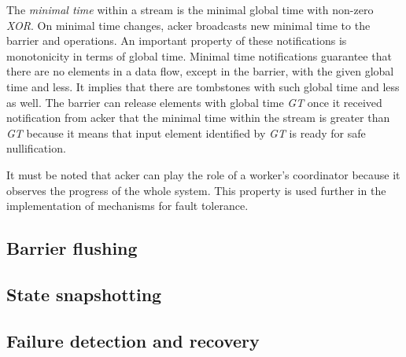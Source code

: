 The {\em minimal time} within a stream is the minimal global time with non-zero {\it XOR}. On minimal time changes, acker broadcasts new minimal time to the barrier and operations. An important property of these notifications is monotonicity in terms of global time. Minimal time notifications guarantee that there are no elements in a data flow, except in the barrier, with the given global time and less. It implies that there are tombstones with such global time and less as well. The barrier can release elements with global time {\it GT} once it received notification from acker that the minimal time within the stream is greater than {\it GT} because it means that input element identified by {\it GT} is ready for safe nullification. 

It must be noted that acker can play the role of a worker's coordinator because it observes the progress of the whole system. This property is used further in the implementation of mechanisms for fault tolerance. 

\subsection{Barrier flushing}


\subsection{State snapshotting}

\subsection{Failure detection and recovery}




